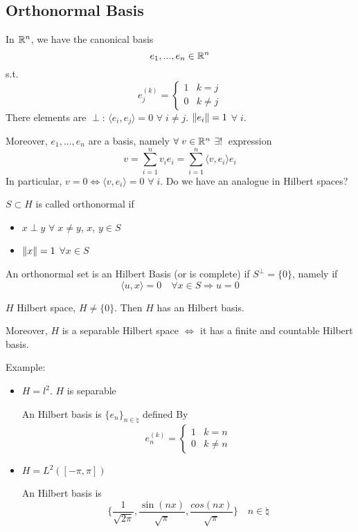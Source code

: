 \subsection*{Orthonormal Basis}

In \(\mathbb{R}^n\), we have the canonical basis
\[
    e_1, ..., e_n \in \mathbb{R}^n
\]
s.t.
\[
    e_j^{(k)} = 
    \begin{cases}
        1 & k=j \\
        0 & k \neq j   
    \end{cases}
\]
There elements are \(\perp\): \(\langle e_i, e_j\rangle   = 0\) \(\forall\; i \neq j\). \(\norm{e_i}=1\) \(\forall\; i\).

Moreover, \(e_1, ..., e_n\) are a basis, namely \(\forall\; v \in \mathbb{R}^n\) \(\exists! \;\) expression
\[
    v = \sum_{i=1}^n v_i e_i = \sum_{i=1}^n \langle v, e_i\rangle   e_i
\]
In particular, \(v=0 \iff \langle v, e_i\rangle  = 0\) \(\forall\; i\). Do we have an analogue in Hilbert spaces?

\begin{definition}
    \(S \subset H\) is called orthonormal if 
    \begin{itemize}
        \item \(x \perp y\) \(\forall\; x \neq y\), \(x\), \(y \in S\)
        \item \(\norm{x} = 1\) \(\forall x \in S\)
    \end{itemize}
\end{definition}
\begin{definition}
    An orthonormal set is an Hilbert Basis (or is complete) if \(S^\perp = \{0\}\), namely if 
    \[
        \langle u, x\rangle   = 0 \quad \forall x \in S \Rightarrow u=0
    \]
\end{definition}
\begin{theorem}
    \(H\) Hilbert space, \(H \neq \{0\}\). Then \(H\) has an Hilbert basis.

    Moreover, \(H\) is a separable Hilbert space \(\iff \) it has a finite and countable Hilbert basis.
\end{theorem}

Example:
\begin{itemize}
    \item \(H = l^2\). \(H\) is separable
    
    An Hilbert basis is \(\{e_n\}_{n \in \natural}\) defined By
    \[
        e_n^{(k)} = 
        \begin{cases}
            1 & k=n \\
            0 & k \neq n
        \end{cases}
    \]

    \item \(H = L^2([-\pi, \pi])\)
    
    An Hilbert basis is
    \[
        \lbrace \frac{1}{\sqrt{2\pi}}, \frac{\sin(nx)}{\sqrt{\pi}}, \frac{cos(nx)}{\sqrt{\pi}} \rbrace \quad n \in \natural
    \]
\end{itemize}

